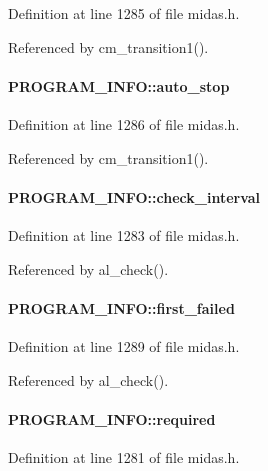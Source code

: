Definition at line 1285 of file midas.h.

Referenced by cm\_\-transition1().
\paragraph[{auto\_\-stop}]{ {\bf PROGRAM\_\-INFO::auto\_\-stop}}\hfill\label{structPROGRAM__INFO_a8faf6dc4903290980912c3e7d328b51e}


Definition at line 1286 of file midas.h.

Referenced by cm\_\-transition1().
\paragraph[{check\_\-interval}]{ {\bf PROGRAM\_\-INFO::check\_\-interval}}\hfill\label{structPROGRAM__INFO_a8d78fc124ff9bc61349951faf9ae09b0}


Definition at line 1283 of file midas.h.

Referenced by al\_\-check().
\paragraph[{first\_\-failed}]{ {\bf PROGRAM\_\-INFO::first\_\-failed}}\hfill\label{structPROGRAM__INFO_afdeda14ba819e8325f2645bfa8a922a6}


Definition at line 1289 of file midas.h.

Referenced by al\_\-check().
\paragraph[{required}]{ {\bf PROGRAM\_\-INFO::required}}\hfill\label{structPROGRAM__INFO_a6ebd759306cb244f02a6b702778c19f4}


Definition at line 1281 of file midas.h.
